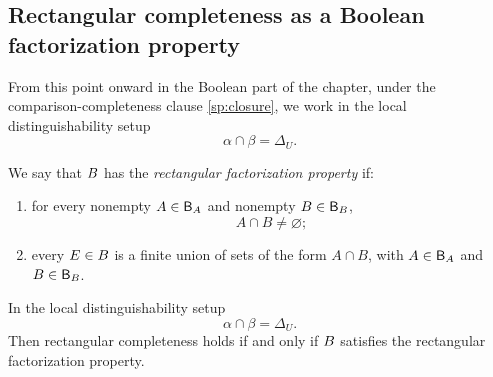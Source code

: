 \subsection{Rectangular completeness as a Boolean factorization property}
From this point onward in the Boolean part of the chapter, under the
comparison-completeness clause \cref{sp:closure}, we work in the local
distinguishability setup
\[
	\alpha\cap\beta=\Delta_U.
\]
\begin{definition}
	We say that \(B\) has the \emph{rectangular factorization property} if:
	\begin{enumerate}
		\item[\emph{(F1)}]
		      for every nonempty \(A\in\mathsf B_A\) and nonempty \(B\in\mathsf B_B\),
		      \[
			      A\cap B\neq\varnothing;
		      \]
		\item[\emph{(F2)}]
		      every \(E\in B\) is a finite union of sets of the form \(A\cap B\),
		      with \(A\in\mathsf B_A\) and \(B\in\mathsf B_B\).
	\end{enumerate}
\end{definition}
\begin{theorem}
	\label{thm:boolean-complete}
	In the local distinguishability setup
	\[
		\alpha\cap\beta=\Delta_U.
	\]
	Then rectangular completeness holds if and only if \(B\) satisfies the
	rectangular factorization property.
\end{theorem}
